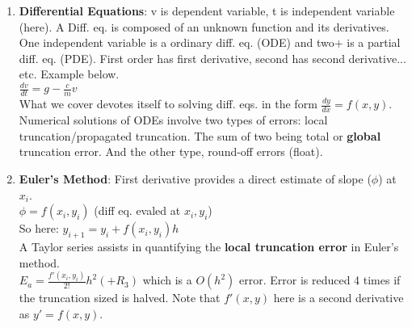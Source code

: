 \documentclass[fontsize=5pt]{scrartcl}
\begin{document}
\begin{multicols}{3}
\begin{enumerate}
          \item \textbf{Differential Equations}: v is dependent variable, t is independent variable (here).
            A Diff. eq. is composed of an unknown function and its derivatives. One independent variable
            is a ordinary diff. eq. (ODE) and two+ is a partial diff. eq. (PDE). First order has first derivative,
            second has second derivative... etc. Example below. \\
            \begin{math}
              \frac{dv}{dt}=g-\frac{c}{m}v
            \end{math}\\
            What we cover devotes itself to solving diff. eqs. in the form $\frac{dy}{dx}=f(x,y)$. \\
            Numerical solutions of ODEs involve two types of errors: local truncation/propagated truncation. The 
            sum of two being total or \textbf{global} truncation error. And the other type, round-off errors (float).\\
          \item \textbf{Euler's Method}: First derivative provides a direct estimate of slope ($\phi$) at $x_i$. \\
            $\phi=f(x_i,y_i)$ (diff eq. evaled at $x_i,y_i$)\\
            So here: $y_{i+1}=y_i+f(x_i,y_i)h$\\
            A Taylor series assists in quantifying the \textbf{local truncation error} in Euler's method.\\
            \begin{math}
              E_a=\frac{f'(x_i,y_i)}{2!}h^2(+R_3)
            \end{math}
            which is a $O(h^2)$ error. Error is reduced 4 times if the truncation sized is halved. Note that
            $f'(x,y)$ here is a second derivative as $y'=f(x,y)$.
            

\end{enumerate}
\end{multicols}
\end{document}
